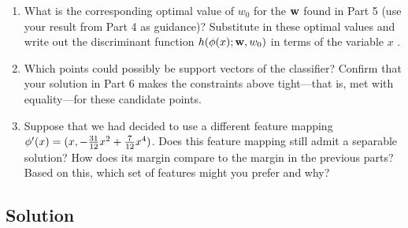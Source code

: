 \documentclass[submit]{harvardml}
\begin{document}
\begin{problem}
\begin{enumerate}
  \item What is the corresponding optimal value of $w_0$ for the $\mathbf{w}$ found in Part 5 (use your result from Part 4 as guidance)? Substitute in these optimal values and write out the discriminant function
    $h(\mathbf{\phi}(x);\mathbf{w},w_0)$ in terms of the variable $x$ .


\item Which points could possibly be support vectors of the classifier?  Confirm that
  your solution in Part 6 makes the constraints above tight---that is,
  met with equality---for these candidate points.

\item Suppose that we had decided to use a different feature mapping
    $\mathbf{\phi}'(x) = (x, -\frac{31}{12}x^2 + \frac{7}{12}x^4 )$.  Does
    this feature mapping still admit a separable solution?  How does
    its margin compare to the margin in the previous parts?  Based on
    this, which set of features might you prefer and why? 
    
\end{enumerate}

\end{problem}

\subsection*{Solution}


\end{document}
